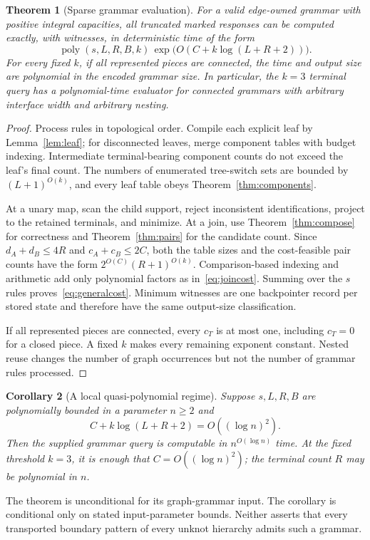 \documentclass[11pt,a4paper]{article}
\newtheorem{theorem}{Theorem}[section]
\newtheorem{corollary}[theorem]{Corollary}
\theoremstyle{definition}
\theoremstyle{remark}
\DeclareMathOperator{\poly}{poly}
\begin{document}
\begin{theorem}[Sparse grammar evaluation]
\label{thm:evaluate}
For a valid edge-owned grammar with positive integral capacities, all truncated marked responses can be computed exactly, with witnesses, in deterministic time of the form
\[
 \poly(s,L,R,B,k)\,
       \exp\!\bigl(O(C+k\log(L+R+2))\bigr).
 \tag{6}\label{eq:generalcost}
\]
For every fixed $k$, if all represented pieces are connected, the time and output size are polynomial in the encoded grammar size. In particular, the $k=3$ terminal query has a polynomial-time evaluator for connected grammars with arbitrary interface width and arbitrary nesting.
\end{theorem}
\begin{proof}
Process rules in topological order. Compile each explicit leaf by Lemma~\ref{lem:leaf}; for disconnected leaves, merge component tables with budget indexing. Intermediate terminal-bearing component counts do not exceed the leaf's final count. The numbers of enumerated tree-switch sets are bounded by $(L+1)^{O(k)}$, and every leaf table obeys Theorem~\ref{thm:components}.

At a unary map, scan the child support, reject inconsistent identifications, project to the retained terminals, and minimize. At a join, use Theorem~\ref{thm:compose} for correctness and Theorem~\ref{thm:pairs} for the candidate count. Since $d_A+d_B\le4R$ and $c_A+c_B\le2C$, both the table sizes and the cost-feasible pair counts have the form $2^{O(C)}(R+1)^{O(k)}$. Comparison-based indexing and arithmetic add only polynomial factors as in~\eqref{eq:joincost}. Summing over the $s$ rules proves~\eqref{eq:generalcost}. Minimum witnesses are one backpointer record per stored state and therefore have the same output-size classification.

If all represented pieces are connected, every $c_T$ is at most one, including $c_T=0$ for a closed piece. A fixed $k$ makes every remaining exponent constant. Nested reuse changes the number of graph occurrences but not the number of grammar rules processed.
\end{proof}

\begin{corollary}[A local quasi-polynomial regime]
\label{cor:qp}
Suppose $s,L,R,B$ are polynomially bounded in a parameter $n\ge2$ and
\[
 C+k\log(L+R+2)=O((\log n)^2).
\]
Then the supplied grammar query is computable in $n^{O(\log n)}$ time. At the fixed threshold $k=3$, it is enough that $C=O((\log n)^2)$; the terminal count $R$ may be polynomial in $n$.
\end{corollary}
The theorem is unconditional for its graph-grammar input. The corollary is conditional only on stated input-parameter bounds. Neither asserts that every transported boundary pattern of every unknot hierarchy admits such a grammar.
\end{document}
